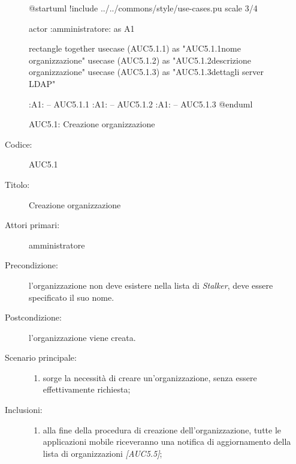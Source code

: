 \documentclass[../analisi-dei-requisiti.tex]{subfiles}
\begin{document}
  \begin{figure}[h!]
    \centering
    \begin{plantuml}
    @startuml
    !include ../../commons/style/use-cases.pu
    scale 3/4

    actor :amministratore: as A1

    rectangle {
      together {
        usecase (AUC5.1.1) as "AUC5.1.1\nInserisci nome organizzazione"
        usecase (AUC5.1.2) as "AUC5.1.2\nInserisci descrizione organizzazione"
        usecase (AUC5.1.3) as "AUC5.1.3\nConfigurazione dettagli server LDAP"
      }
    }

    :A1: -- AUC5.1.1
    :A1: -- AUC5.1.2
    :A1: -- AUC5.1.3
    @enduml
    \end{plantuml}
    \caption{AUC5.1: Creazione organizzazione}
    \label{fig:AUC5_1}
  \end{figure}

  \begin{description}
    \item[Codice:] AUC5.1
    \item[Titolo:] Creazione organizzazione
    \item[Attori primari:] amministratore
    \item[Precondizione:] l'organizzazione non deve esistere nella lista di \emph{Stalker}, deve essere specificato il suo nome.
    \item[Postcondizione:] l'organizzazione viene creata.
    \item[Scenario principale:]
    \begin{enumerate}
      \item sorge la necessità di creare un'organizzazione, senza essere effettivamente richiesta;
    \end{enumerate}
    \item[Inclusioni:]
    \begin{enumerate}
      \item alla fine della procedura di creazione dell'organizzazione, tutte le applicazioni mobile riceveranno una notifica di aggiornamento della lista di organizzazioni \emph{[AUC5.5]};
    \end{enumerate}
  \end{description}
\end{document}
